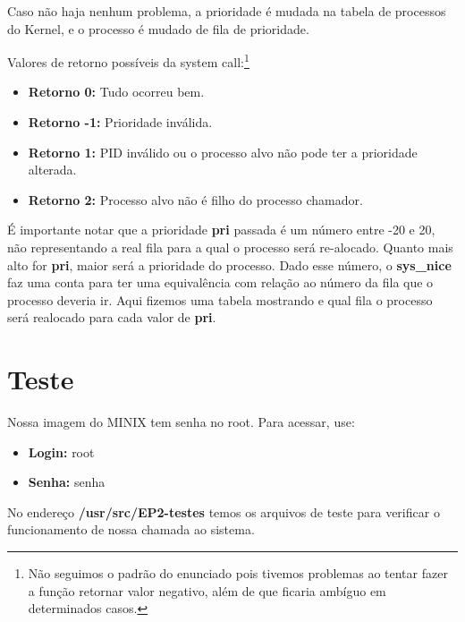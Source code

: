 \documentclass[11pt]{article}
\begin{document}
Caso não haja nenhum problema, a prioridade é mudada na tabela de processos do
Kernel, e o processo é mudado de fila de prioridade.

Valores de retorno possíveis da system call:\footnote{Não seguimos o padrão do enunciado pois tivemos problemas ao tentar fazer a função retornar valor negativo, além de que ficaria ambíguo em determinados casos.}

\begin{itemize}

	\item \textbf{Retorno 0:} Tudo ocorreu bem.

	\item \textbf{Retorno -1:} Prioridade inválida.

	\item \textbf{Retorno 1:} PID inválido ou o processo alvo não pode ter a prioridade alterada.

	\item \textbf{Retorno 2:} Processo alvo não é filho do processo chamador.

\end{itemize}

É importante notar que a prioridade \textbf{pri} passada é um número entre -20 e 20, 
não representando a real fila para a qual o processo será re-alocado. Quanto mais alto 
for \textbf{pri}, maior será a prioridade do processo. Dado esse número, o \textbf{sys\_nice} faz uma conta para ter uma equivalência com relação ao número da fila
que o processo deveria ir. Aqui fizemos uma tabela mostrando e qual fila o processo será
realocado para cada valor de \textbf{pri}.


\section{Teste}

Nossa imagem do MINIX tem senha no root. Para acessar, use:

\begin{itemize}
	\item \textbf{Login:} root
	\item \textbf{Senha:} senha
\end{itemize}

No endereço \textbf{/usr/src/EP2-testes} temos os arquivos de teste para verificar o funcionamento de nossa chamada ao sistema. 
\end{document}
